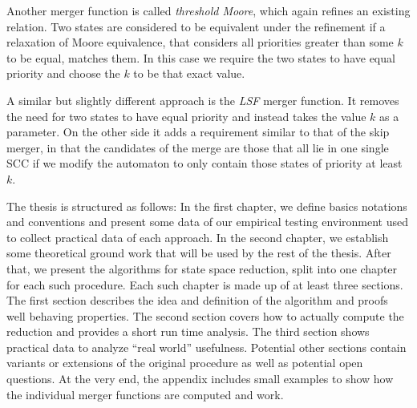 Another merger function is called \emph{threshold Moore}, which again refines an existing relation. Two states are considered to be equivalent under the refinement if a relaxation of Moore equivalence, that considers all priorities greater than some $k$ to be equal, matches them. In this case we require the two states to have equal priority and choose the $k$ to be that exact value.

A similar but slightly different approach is the \emph{LSF} merger function. It removes the need for two states to have equal priority and instead takes the value $k$ as a parameter. On the other side it adds a requirement similar to that of the skip merger, in that the candidates of the merge are those that all lie in one single SCC if we modify the automaton to only contain those states of priority at least $k$.
\vspace{5pt}

The thesis is structured as follows: In the first chapter, we define basics notations and conventions and present some data of our empirical testing environment used to collect practical data of each approach.
In the second chapter, we establish some theoretical ground work that will be used by the rest of the thesis.
After that, we present the algorithms for state space reduction, split into one chapter for each such procedure. Each such chapter is made up of at least three sections. The first section describes the idea and definition of the algorithm and proofs well behaving properties. The second section covers how to actually compute the reduction and provides a short run time analysis. The third section shows practical data to analyze \enquote{real world} usefulness. Potential other sections contain variants or extensions of the original procedure as well as potential open questions. 
At the very end, the appendix includes small examples to show how the individual merger functions are computed and work.




